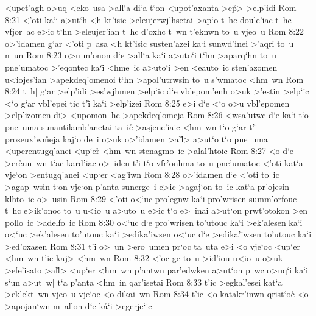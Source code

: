 <upet'agh
o>uq
<eko~usa
>all`a
di`a
t`on
<upot'axanta
>e\r{p}>
>elp'idi\bibvsend
\vs Rom 8:21
<'oti
ka`i
a>ut`h
<h
kt'isic
>eleujerwj'hsetai
>ap`o
t~hc
doule'iac
t~hc
vfjor~ac
e>ic
t`hn
>eleujer'ian
t~hc
d'oxhc
t~wn
t'eknwn
to~u
vjeo~u\bibvsend
\vs Rom 8:22
o>'idamen
g`ar
<'oti
p~asa
<h
kt'isic
susten'azei
ka`i
sunwd'inei
>'aqri
to~u
n~un\bibvsend
\vs Rom 8:23
o>u
m'onon
d`e
>all`a
ka`i
a>uto`i
t`hn
>aparq`hn
to~u
pne'umatoc
>'eqontec
ka`i\r{}
<hme~ic
a>uto`i
>en
<eauto~ic
sten'azomen
u<iojes'ian
>apekdeq'omenoi
t`hn
>apol'utrwsin
to~u
s'wmatoc
<hm~wn\bibvsend
\vs Rom 8:24
t~h|
g`ar
>elp'idi
>es'wjhmen
>elp`ic
d`e
vblepom'enh
o>uk
>'estin
>elp`ic
<`o
g`ar
vbl'epei
tic
t'i\r{}
ka`i
>elp'izei\bibvsend
\vs Rom 8:25
e>i
d`e
<`o
o>u
vbl'epomen
>elp'izomen
di>
<upomon~hc
>apekdeq'omeja\bibvsend
\vs Rom 8:26
<wsa'utwc
d`e
ka`i
t`o
pne~uma
sunantilamb'anetai
ta~ic\r{}
>asjene'iaic
<hm~wn
t`o
g`ar
t'i
proseux'w\r{m}eja
kaj`o
de~i
o>uk
o>'idamen
>al\r{l}>
a>ut`o
t`o
pne~uma
<uperentugq'anei
<up`er\r{}
<hm~wn
stenagmo~ic
>alal'htoic\bibvsend
\vs Rom 8:27
<o
d`e
>er\r{e}un~wn
t`ac
kard'iac
o>~iden
t'i
t`o
vfr'onhma
to~u
pne'umatoc
<'oti
kat`a
vje`on
>entugq'anei
<up`er
<ag'iwn\bibvsend
\vs Rom 8:28
o>'idamen
d`e
<'oti
to~ic
>agap~wsin
t`on
vje`on
p'anta
sunerge~i
e>ic
>agaj`on
to~ic
kat`a
pr'ojesin
klhto~ic
o>~usin\bibvsend
\vs Rom 8:29
<'oti
o<`uc
pro'egnw
ka`i
pro'wrisen
summ'orfouc
t~hc
e>ik'onoc
to~u
u<io~u
a>uto~u
e>ic
t`o
e>~inai
a>ut`on
prwt'otokon
>en
pollo~ic
>adelfo~ic\bibvsend
\vs Rom 8:30
o<`uc
d`e
pro'wrisen
to'utouc
ka`i
>ek'alesen
ka`i
o<`uc
>ek'alesen
to'utouc
ka`i
>edika'iwsen
o<`uc
d`e
>edika'iwsen
to'utouc
ka`i
>ed'oxasen\bibvsend
\vs Rom 8:31
t'i
o>~un
>ero~umen
pr`oc
ta~uta
e>i
<o
vje`oc
<up`er
<hm~wn
t'ic
kaj>
<hm~wn\bibvsend
\vs Rom 8:32
<'oc
ge
to~u
>id'iou
u<io~u
o>uk
>efe'isato
>al\r{l}>
<up`er
<hm~wn
p'antwn
par'edwken
a>ut`on
p~wc
o>uq`i
ka`i
s`un
a>ut~w|
t`a
p'anta
<hm~in
qar'isetai\bibvsend
\vs Rom 8:33
t'ic
>egkal'esei
kat`a
>eklekt~wn
vjeo~u
vje`oc
<o
dikai~wn\bibvsend
\vs Rom 8:34
t'ic
<o
katakr'inwn
qrist`o\r{c}
<o
>apojan`wn
m~allon
d`e
k\r{a}`i
>egerje`ic
